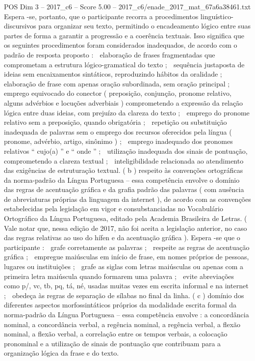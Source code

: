 \begin{textsample}{POS Dim 3 – 2017\_c6 – Score 5.00 – 2017\_c6/enade\_2017\_mat\_67a6a38461.txt}
Espera -se, portanto, que o participante recorra a procedimentos linguístico-discursivos para organizar seu texto, permitindo o encadeamento lógico entre suas partes de forma a garantir a progressão e a coerência textuais.
Isso significa que os seguintes procedimentos foram considerados inadequados, de acordo com o padrão de resposta proposto :  elaboração de frases fragmentadas que comprometam a estrutura lógico-gramatical do texto ;  sequência justaposta de ideias sem encaixamentos sintáticos, reproduzindo hábitos da oralidade ;  elaboração de frase com apenas oração subordinada, sem oração principal ;  emprego equivocado do conector ( preposição, conjunção, pronome relativo, alguns advérbios e locuções adverbiais ) comprometendo a expressão da relação lógica entre duas ideias, com prejuízo da clareza do texto ;  emprego do pronome relativo sem a preposição, quando obrigatória ;  repetição ou substituição inadequada de palavras sem o emprego dos recursos oferecidos pela língua ( pronome, advérbio, artigo, sinônimo ) ;  emprego inadequado dos pronomes relativos “ cujo(a) ” e “ onde ” ;  utilização inadequada dos sinais de pontuação, comprometendo a clareza textual ;  inteligibilidade relacionada ao atendimento das exigências de estruturação textual. ( b ) respeito às convenções ortográficas da norma-padrão da Língua Portuguesa – essa competência envolve o domínio das regras de acentuação gráfica e da grafia padrão das palavras ( com ausência de abreviaturas próprias da linguagem da internet ), de acordo com as convenções estabelecidas pela legislação em vigor e consubstanciadas no Vocabulário Ortográfico da Língua Portuguesa, editado pela Academia Brasileira de Letras. ( Vale notar que, nessa edição de 2017, não foi aceita a legislação anterior, no caso das regras relativas ao uso do hífen e da acentuação gráfica ).
Espera -se que o participante :  grafe corretamente as palavras ;  respeite as regras de acentuação gráfica ;  empregue maiúsculas em início de frase, em nomes próprios de pessoas, lugares ou instituições ;  grafe as siglas com letras maiúsculas ou apenas com a primeira letra maiúscula quando formarem uma palavra ;  evite abreviações como p/, vc, tb, pq, tá, né, usadas muitas vezes em escrita informal e na internet ;  obedeça às regras de separação de sílabas no final da linha. ( c ) domínio dos diferentes aspectos morfossintáticos próprios da modalidade escrita formal da norma-padrão da Língua Portuguesa – essa competência envolve : a concordância nominal, a concordância verbal, a regência nominal, a regência verbal, a flexão nominal, a flexão verbal, a correlação entre os tempos verbais, a colocação pronominal e a utilização de sinais de pontuação que contribuam para a organização lógica da frase e do texto.

\end{textsample}

